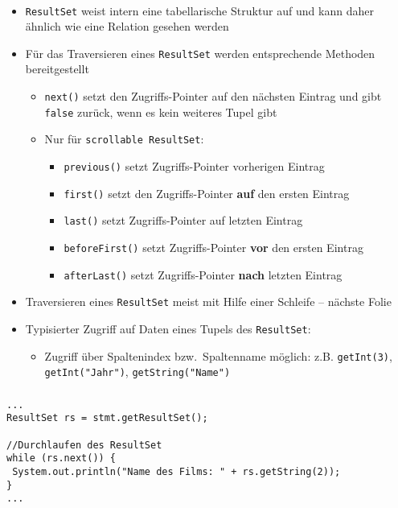 \begin{frame}[fragile]
\frametitle{\insertsection}
\framesubtitle{\insertsubsection}
\onslide
{}\\[4pt]
\begin{itemize}
	\item \texttt{ResultSet} weist intern eine tabellarische Struktur auf und kann daher \"ahnlich wie eine Relation gesehen werden
	\pause
	\item F\"ur das Traversieren eines \texttt{ResultSet} werden entsprechende Methoden bereitgestellt
	\begin{itemize}
		\item \texttt{next()} setzt den Zugriffs-Pointer auf den nächsten Eintrag und gibt \texttt{false} zur\"uck, wenn es kein 
		weiteres Tupel gibt 
		\item Nur f\"ur \texttt{scrollable ResultSet}:
		\begin{itemize}
			\item \texttt{previous()} setzt Zugriffs-Pointer vorherigen Eintrag
			\item \texttt{first()} setzt den Zugriffs-Pointer \textbf{auf} den ersten Eintrag
			\item \texttt{last()} setzt Zugriffs-Pointer auf letzten Eintrag
			\item \texttt{beforeFirst()} setzt Zugriffs-Pointer \textbf{vor} den ersten Eintrag
			\item \texttt{afterLast()} setzt Zugriffs-Pointer \textbf{nach} letzten Eintrag
		\end{itemize}
	\end{itemize}
	\item Traversieren eines \texttt{ResultSet} meist mit Hilfe einer Schleife -- n\"achste Folie
	\pause
	\item Typisierter Zugriff auf Daten eines Tupels des \texttt{ResultSet}:
	\begin{itemize}
		\item Zugriff über Spaltenindex bzw.~Spaltenname m\"oglich: z.B. \texttt{getInt(3)}, \texttt{getInt("Jahr")},
		\texttt{getString("Name")}
	\end{itemize}
\end{itemize}
\end{frame}

\begin{frame}[fragile]
\frametitle{\insertsection}
\framesubtitle{\insertsubsection}
\lstset{language=Java}
\begin{lstlisting}[xleftmargin=3ex, showstringspaces=false, numbers=none]
...			
ResultSet rs = stmt.getResultSet(); 

//Durchlaufen des ResultSet
while (rs.next()) {
 System.out.println("Name des Films: " + rs.getString(2)); 
}
...
\end{lstlisting}
\end{frame}


